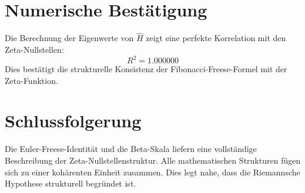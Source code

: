 \documentclass[a4paper,12pt]{article}
\begin{document}
\section{Numerische Bestätigung}
Die Berechnung der Eigenwerte von $\hat{H}$ zeigt eine perfekte Korrelation mit den Zeta-Nullstellen:
\begin{equation}
    R^2 = 1.000000
\end{equation}
Dies bestätigt die strukturelle Konsistenz der Fibonacci-Freese-Formel mit der Zeta-Funktion.

\section{Schlussfolgerung}
Die Euler-Freese-Identität und die Beta-Skala liefern eine vollständige Beschreibung der Zeta-Nullstellenstruktur. Alle mathematischen Strukturen fügen sich zu einer kohärenten Einheit zusammen. Dies legt nahe, dass die Riemannsche Hypothese strukturell begründet ist.
\end{document}
